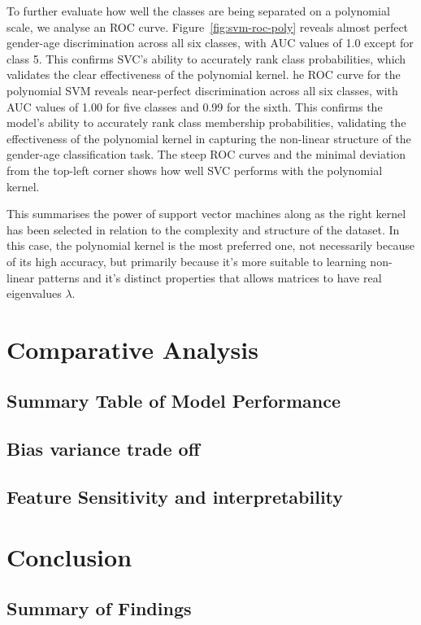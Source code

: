 \documentclass[10pt,twocolumn]{article}
\begin{document}
To further evaluate how well the classes are being separated on a polynomial scale, we analyse an ROC curve. Figure~\ref{fig:svm-roc-poly} reveals almost perfect gender-age discrimination across all six classes, with AUC values of 1.0 except for class 5. This confirms  SVC's ability to accurately rank class probabilities, which validates the clear effectiveness of the polynomial kernel.
he ROC curve for the polynomial SVM reveals near-perfect discrimination across all six classes, with AUC values of 1.00 for five classes and 0.99 for the sixth. This confirms the model’s ability to accurately rank class membership probabilities, validating the effectiveness of the polynomial kernel in capturing the non-linear structure of the gender-age classification task. The steep ROC curves and the minimal deviation from the top-left corner shows how well SVC performs with the polynomial kernel.

This summarises the power of support vector machines along as the right kernel has been selected in relation to the complexity and structure of the dataset. In this case, the polynomial kernel is the most preferred one, not necessarily because of its high accuracy, but primarily because it's more suitable to learning non-linear patterns and it's distinct properties that allows matrices to have real eigenvalues $\lambda$.
\section{Comparative Analysis}


\subsection{Summary Table of Model Performance}

\subsection{Bias variance trade off}

\subsection{Feature Sensitivity and interpretability}


\section{Conclusion}


\subsection{Summary of Findings}
\end{document}
